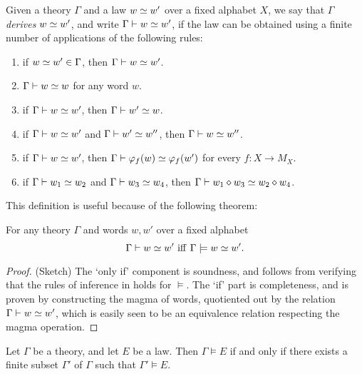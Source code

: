 \begin{definition}[Derivation]\label{derivation-def}
  \leanok
  Given a theory $\Gamma$ and a law $w\simeq w'$ over a fixed alphabet $X$, we say that
  $\Gamma$ \emph{derives} $w\simeq w'$, and write $\Gamma\vdash w\simeq w'$, if the law can
  be obtained using a finite number of applications of the following rules:
  \begin{enumerate}
    \item if $w\simeq w' \in \Gamma$, then $\Gamma\vdash w\simeq w'$.
    \item $\Gamma\vdash w\simeq w$ for any word $w$.
    \item if $\Gamma\vdash w\simeq w'$, then $\Gamma\vdash w'\simeq w$.
    \item if $\Gamma\vdash w\simeq w'$ and $\Gamma\vdash w'\simeq w''$, then $\Gamma\vdash w\simeq w''$.
    \item if $\Gamma\vdash w\simeq w'$, then $\Gamma\vdash \varphi_f(w) \simeq \varphi_f(w')$ for every $f: X \to M_X$.
    \item if $\Gamma\vdash w_1\simeq w_2$ and $\Gamma\vdash w_3\simeq w_4$, then $\Gamma\vdash w_1 \diamond w_3\simeq w_2\diamond w_4$.
  \end{enumerate}
\end{definition}

This definition is useful because of the following theorem:

\begin{theorem}\label{sound-complete}\leanok{}
  For any theory $\Gamma$ and words $w, w'$ over a fixed alphabet
  $$ \Gamma\vdash w\simeq w'\ \mathrm{iff}\ \Gamma\models w\simeq w'.$$
\end{theorem}

\begin{proof}
  \leanok
  (Sketch) The `only if' component is soundness, and follows from verifying that the rules of inference in  holds for $\models$. The `if' part is completeness, and is proven by constructing the magma of words, quotiented out by the relation $\Gamma \vdash w \simeq w'$, which is easily seen to be an equivalence relation respecting the magma operation.
\end{proof}

\begin{corollary}\label{compactness-thm}
  Let $\Gamma$ be a theory, and let $E$ be a law.
  Then $\Gamma \models E$ if and only if there exists a finite subset $\Gamma'$ of $\Gamma$ such that $\Gamma' \models E$.
\end{corollary}

